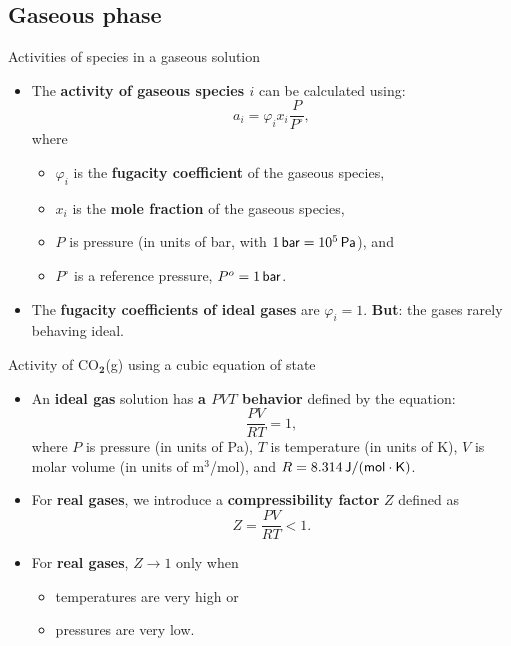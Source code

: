 \subsection{Gaseous phase}
%
%
\begin{frame}{Activities of species in a gaseous solution}
\begin{itemize}
\item The \alert{\textbf{activity of gaseous species $i$}} can be calculated using:
\[
\boxed{a_{i}=\varphi_{i}x_{i}\frac{P}{P^{\circ}}},
\]
where 
\begin{itemize}
\item $\varphi_{i}$ is the \textbf{fugacity coefficient} of the gaseous species,
\item $x_{i}$ is the \textbf{mole fraction} of the gaseous species,
\item $P$ is pressure (in units of bar, with $\unit[1]{\mathsf{bar}}=\unit[10^{5}]{\mathsf{Pa}}$),
and 
\item $P^{\circ}$ is a reference pressure, $P^{\circ}=\unit[1]{\mathsf{bar}}$.
\end{itemize}
\pause
\item The \textbf{fugacity coefficients of ideal gases} are $\varphi_{i}=1$. \textbf{But}: the gases rarely behaving ideal.  
\end{itemize}
\end{frame}
%
%
\begin{frame}{Activity of CO$_{\boldsymbol{2}}$(g) using a cubic equation of state}
\begin{itemize}
\item An \textbf{ideal gas} solution has \alert{\textbf{a $PVT$ behavior}} defined by the equation:
\[
\frac{PV}{RT}=1,
\]
where $P$ is pressure (in units of Pa), $T$ is temperature (in units
of K), $V$ is molar volume (in units of m$^{3}$/mol), and $R=\unit[8.314]{\mathsf{J/(mol\cdot K)}}$.
\pause
\item For \textbf{real gases}, we introduce a \alert{\textbf{compressibility factor}} $Z$ defined as
%
\[
Z=\frac{PV}{RT} < 1.
\]
\pause
\item For \textbf{real gases}, $Z \to 1$ only when
\begin{itemize}
\item temperatures are very high or
\item pressures are very low.
\end{itemize}
\end{itemize}
\end{frame}
